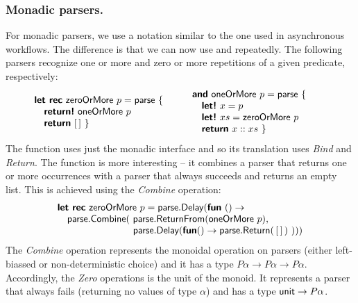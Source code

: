 \documentclass[runningheads,a4paper]{llncs}
\begin{document}
\vspace{-1em}
\subsubsection{Monadic parsers.} For monadic parsers, we use a notation similar to the one used in
asynchronous workflows. The difference is that we can now use  and  
repeatedly. The following parsers recognize one or more and zero or more repetitions of a given
predicate, respectively:
%
\vspace{-0.5em}\begin{equation*}
\hspace{-2em} \begin{array}{l}
\kvd{let rec}~\ident{zeroOrMore}~p = \ident{parse}~\{\\
\quad \kvd{return!}~\ident{oneOrMore}~p\\
\quad \kvd{return}~[\,] ~\}
\end{array}
\qquad
\begin{array}{l}
\kvd{and}~\ident{oneOrMore}~p = \ident{parse}~\{\\
\quad \kvd{let!}~x=p\\
\quad \kvd{let!}~xs = \ident{zeroOrMore}~p\\
\quad \kvd{return}~x::xs ~\}
\end{array}
\vspace{-0.5em}
\end{equation*}
%
The  function uses just the monadic interface and so its translation uses 
\emph{Bind} and \emph{Return}. The  function is more interesting -- it combines
a parser that returns one or more occurrences with a parser that always succeeds and returns an empty 
list. This is achieved using the \emph{Combine} operation:
%
\begin{equation*}
\begin{array}{l}
\kvd{let rec}~\ident{zeroOrMore}~p = \ident{parse}.\ident{Delay}(\kvd{fun}~()\rightarrow \\
\quad \ident{parse}.\ident{Combine}(~\ident{parse}.\ident{ReturnFrom}(\ident{oneOrMore}~p), \\
\hspace{7.8em} \ident{parse}.\ident{Delay}(\kvd{fun} () \rightarrow \ident{parse}.\ident{Return}(\,[\,]\,)~)))
\end{array}
\end{equation*}
%
The \emph{Combine} operation represents the monoidal operation on parsers (either left-biassed or
non-deterministic choice) and it has a type $P\alpha \rightarrow P\alpha \rightarrow P\alpha$. Accordingly,
the \emph{Zero} operations is the unit of the monoid. It represents a parser that always fails (returning
no values of type $\alpha$) and has a type $\textnormal{\sffamily unit}\rightarrow P\alpha$.
\end{document}
